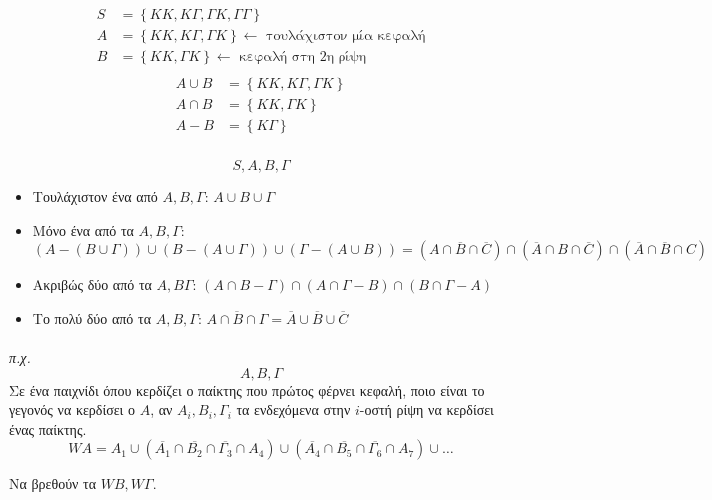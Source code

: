 \documentclass[11pt,a4paper,titlepage,draft]{article}
\begin{document}
\subsubsection{}
\begin{align*}
S &=  \left\lbrace KK, K\Gamma, \Gamma K, \Gamma \Gamma \right\rbrace \\
A &=  \left\lbrace KK, K \Gamma, \Gamma K  \right\rbrace \leftarrow \text{ τουλάχιστον μία κεφαλή} \\
B &= \left\lbrace KK, \Gamma K  \right\rbrace \leftarrow \text{ κεφαλή στη 2η ρίψη} \\
\end{align*}
\begin{align*}
A\cup B &=  \left\lbrace KK, K \Gamma , \Gamma K  \right\rbrace \\
A\cap B &=  \left\lbrace KK,  \Gamma K  \right\rbrace \\
A-B &=  \left\lbrace K \Gamma  \right\rbrace
\end{align*}

\subsubsection{}
\[S,A,B, \Gamma \]
\begin{itemize}
\item Τουλάχιστον ένα από \(A,B, \Gamma \): \(A \cup B \cup  \Gamma \)
\item Μόνο ένα από τα \(Α,Β, \Gamma \): \(
\left( A - \left( B \cup \Gamma \right) \right) \cup
\left( B - \left( A \cup \Gamma \right) \right) \cup
\left( \Gamma  - \left( A \cup B \right) \right) =
\left( A \cap \overline{B} \cap \overline{C} \right) \cap
\left( \overline{A} \cap B \cap \overline{C} \right) \cap
\left( \overline{A} \cap \overline{B} \cap C \right)
\)
\item Ακριβώς δύο από τα \(A,B \Gamma \):
\(
\left(A \cap B - \Gamma \right) \cap
\left(A \cap \Gamma  - B \right) \cap
\left(B \cap  \Gamma - A \right)
\)
\item Το πολύ δύο από τα \(A,B, \Gamma\):
\(
\overline{A \cap B \cap \Gamma } = \overline{A} \cup \overline{B} \cup \overline{C}
\)
\end{itemize}

\paragraph{}
\textit{π.χ.}
\[A,B, \Gamma \]
Σε ένα παιχνίδι όπου κερδίζει ο παίκτης που πρώτος φέρνει κεφαλή, ποιο είναι το γεγονός να κερδίσει ο \(A\), αν \(A_i, B_i, \Gamma_i\) τα ενδεχόμενα στην \(i\)-οστή ρίψη να κερδίσει ένας παίκτης.
\[
WA = A_1 \cup \left( \overline{A_1} \cap \overline{B_2} \cap \overline{\Gamma_3} \cap A_4 \right) \cup \left( \overline{A_4} \cap \overline{B_5} \cap \overline{\Gamma_6} \cap A_7 \right) \cup \dots
\]

Να βρεθούν τα \(WB, W \Gamma \).
\end{document}
